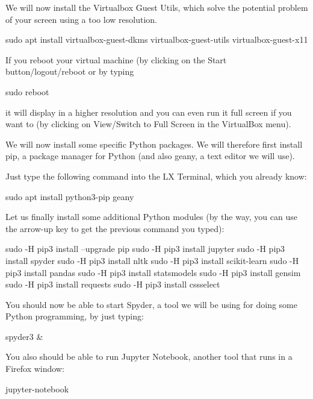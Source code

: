 \documentclass[a4paper,12pt]{book}
\begin{document}
We will now install the Virtualbox Guest Utils, which solve the potential problem of your screen using a too low resolution.

\begin{lstlistingbash}
sudo apt install virtualbox-guest-dkms virtualbox-guest-utils virtualbox-guest-x11
\end{lstlistingbash}
 
If you reboot your virtual machine (by clicking on the Start button/logout/reboot or by typing
\begin{lstlistingbash}
sudo reboot
\end{lstlistingbash}
it will display in a higher resolution and you can even run it full screen if you want to (by clicking on View/Switch to Full Screen in the VirtualBox menu).

We will now install some specific Python packages. We will therefore first install pip, a package manager for Python (and also geany, a text editor we will use). 

Just type the following command into the LX Terminal, which you already know:

\begin{lstlistingbash}
sudo apt install python3-pip geany
\end{lstlistingbash}

Let us finally install some additional Python modules (by the way, you can use the arrow-up key to get the previous command you typed):

\begin{lstlistingbash}
sudo -H pip3 install --upgrade pip
sudo -H pip3 install jupyter
sudo -H pip3 install spyder
sudo -H pip3 install nltk
sudo -H pip3 install scikit-learn
sudo -H pip3 install pandas
sudo -H pip3 install statsmodels
sudo -H pip3 install gensim
sudo -H pip3 install requests
sudo -H pip3 install cssselect
\end{lstlistingbash}

You should now be able to start Spyder, a tool we will be using for doing some Python programming, by just typing:

\begin{lstlistingbash}
spyder3 &
\end{lstlistingbash}


You also should be able to run Jupyter Notebook, another tool that runs in a Firefox window:


\begin{lstlistingbash}
jupyter-notebook
\end{lstlistingbash}
\end{document}
